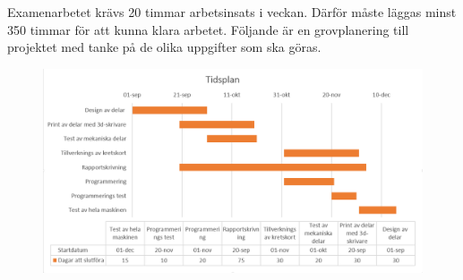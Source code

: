 Examenarbetet krävs 20 timmar arbetsinsats i veckan. Därför måste läggas minst 350 timmar 
för att kunna klara arbetet. Följande är en grovplanering till projektet med tanke på de olika uppgifter som ska göras. \\


\begin{figure}[h]
	\begin{center}
		\includegraphics[scale=0.5] {images/tidsplan.png}
		\label{Tidsplan}	
	\end{center}
\end{figure}